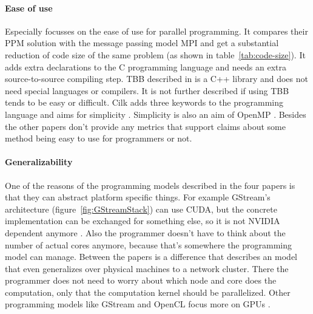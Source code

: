 \paragraph{Ease of use} Especially \cite{BrightwellParallelPhaseModel} focusses
on the ease of use for parallel programming. It compares their PPM solution
with the message passing model MPI and get a substantial reduction of code size
of the same problem (as shown in table~\ref{tab:code-size}). It adds extra
declarations to the C programming language and needs an extra source-to-source
compiling step. TBB described in
\cite{KimExploitingMultiManyCore,CaoPerformanceAnalysis} is a C++ library and
does not need special languages or compilers. It is not further described if
using TBB tends to be easy or difficult. Cilk adds three keywords to the
programming language and aims for simplicity \cite{KimExploitingMultiManyCore}.
Simplicity is also an aim of OpenMP \cite{KimExploitingMultiManyCore}. Besides
\cite{BrightwellParallelPhaseModel} the other papers don't provide any metrics
that support claims about some method being easy to use for programmers or not.

\paragraph{Generalizability} One of the reasons of the programming models
described in the four papers is that they can abstract platform specific
things. For example GStream's architecture (figure~\ref{fig:GStreamStack}) can
use CUDA, but the concrete implementation can be exchanged for something else,
so it is not NVIDIA dependent anymore \cite{ZhangDataParallelProgramming}.
Also the programmer doesn't have to think about the number of actual cores
anymore, because that's somewhere the programming model can manage. Between
the papers is a difference that \cite{BrightwellParallelPhaseModel} describes
an model that even generalizes over physical machines to a network cluster.
There the programmer does not need to worry about which node and core does the
computation, only that the computation kernel should be parallelized. Other
programming models like GStream and OpenCL focus more on GPUs
\cite{KimExploitingMultiManyCore, ZhangDataParallelProgramming}.
